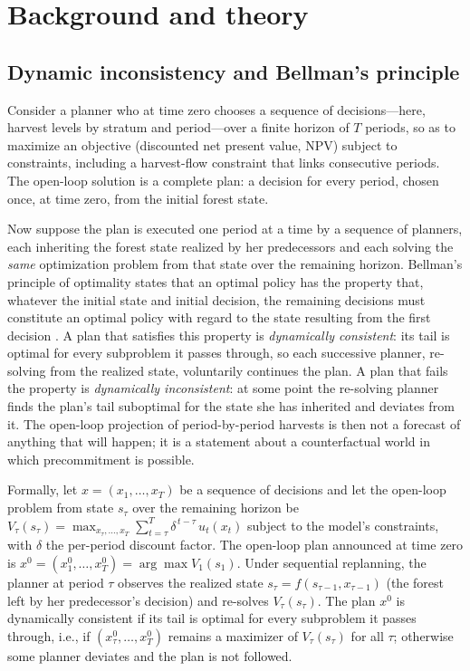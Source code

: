 \section{Background and theory}

\hypertarget{dynamic-inconsistency-and-bellmans-principle}{%
\subsection{Dynamic inconsistency and Bellman's principle}\label{dynamic-inconsistency-and-bellmans-principle}}

Consider a planner who at time zero chooses a sequence of decisions---here, harvest levels by stratum and period---over a finite horizon of \(T\) periods, so as to maximize an objective (discounted net present value, NPV) subject to constraints, including a harvest-flow constraint that links consecutive periods. The open-loop solution is a complete plan: a decision for every period, chosen once, at time zero, from the initial forest state.

Now suppose the plan is executed one period at a time by a sequence of planners, each inheriting the forest state realized by her predecessors and each solving the \emph{same} optimization problem from that state over the remaining horizon. Bellman's principle of optimality states that an optimal policy has the property that, whatever the initial state and initial decision, the remaining decisions must constitute an optimal policy with regard to the state resulting from the first decision \citep{bellman1957dynamic}. A plan that satisfies this property is \emph{dynamically consistent}: its tail is optimal for every subproblem it passes through, so each successive planner, re-solving from the realized state, voluntarily continues the plan. A plan that fails the property is \emph{dynamically inconsistent}: at some point the re-solving planner finds the plan's tail suboptimal for the state she has inherited and deviates from it. The open-loop projection of period-by-period harvests is then not a forecast of anything that will happen; it is a statement about a counterfactual world in which precommitment is possible.

Formally, let \(x = (x_1, \ldots, x_T)\) be a sequence of decisions and let the open-loop problem from state \(s_\tau\) over the remaining horizon be \(V_\tau(s_\tau) = \max_{x_\tau, \ldots, x_T} \sum_{t=\tau}^{T} \delta^{\,t-\tau} \, u_t(x_t)\) subject to the model's constraints, with \(\delta\) the per-period discount factor. The open-loop plan announced at time zero is \(x^{0} = (x_1^{0}, \ldots, x_T^{0}) = \arg\max V_1(s_1)\). Under sequential replanning, the planner at period \(\tau\) observes the realized state \(s_\tau = f(s_{\tau-1}, x_{\tau-1})\) (the forest left by her predecessor's decision) and re-solves \(V_\tau(s_\tau)\). The plan \(x^{0}\) is dynamically consistent if its tail is optimal for every subproblem it passes through, i.e., if \((x_\tau^{0}, \ldots, x_T^{0})\) remains a maximizer of \(V_\tau(s_\tau)\) for all \(\tau\); otherwise some planner deviates and the plan is not followed.

